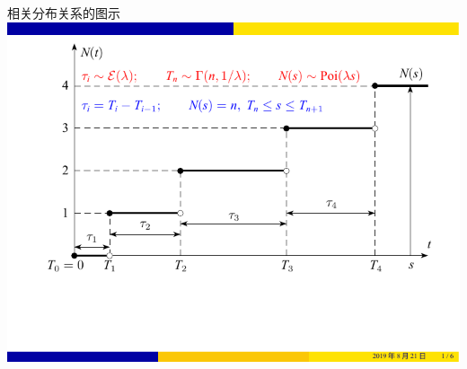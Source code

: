 \documentclass[t]{beamer}
\begin{document}
\begin{frame}{相关分布关系的图示}
    \centering
	\includegraphics{fig/poisson1.pdf}
\end{frame}
\end{document}
